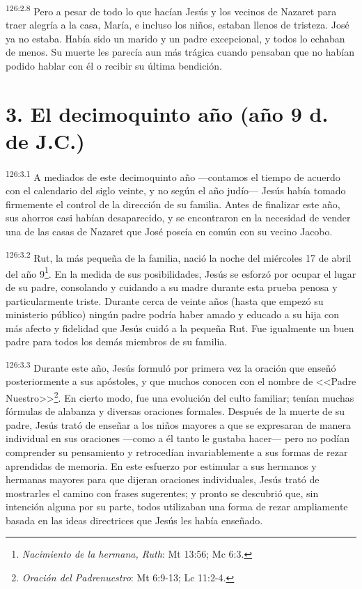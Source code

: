 \par 
\textsuperscript{126:2.8} Pero a pesar de todo lo que hacían Jesús y los vecinos de Nazaret para traer alegría a la casa, María, e incluso los niños, estaban llenos de tristeza. José ya no estaba. Había sido un marido y un padre excepcional, y todos lo echaban de menos. Su muerte les parecía aun más trágica cuando pensaban que no habían podido hablar con él o recibir su última bendición.

\section*{3. El decimoquinto año (año 9 d. de J.C.)}
\par 
\textsuperscript{126:3.1} A mediados de este decimoquinto año ---contamos el tiempo de acuerdo con el calendario del siglo veinte, y no según el año judío--- Jesús había tomado firmemente el control de la dirección de su familia. Antes de finalizar este año, sus ahorros casi habían desaparecido, y se encontraron en la necesidad de vender una de las casas de Nazaret que José poseía en común con su vecino Jacobo.

\par 
\textsuperscript{126:3.2} Rut, la más pequeña de la familia, nació la noche del miércoles 17 de abril del año 9\footnote{\textit{Nacimiento de la hermana, Ruth}: Mt 13:56; Mc 6:3.}. En la medida de sus posibilidades, Jesús se esforzó por ocupar el lugar de su padre, consolando y cuidando a su madre durante esta prueba penosa y particularmente triste. Durante cerca de veinte años (hasta que empezó su ministerio público) ningún padre podría haber amado y educado a su hija con más afecto y fidelidad que Jesús cuidó a la pequeña Rut. Fue igualmente un buen padre para todos los demás miembros de su familia.

\par 
\textsuperscript{126:3.3} Durante este año, Jesús formuló por primera vez la oración que enseñó posteriormente a sus apóstoles, y que muchos conocen con el nombre de <<Padre Nuestro>>\footnote{\textit{Oración del Padrenuestro}: Mt 6:9-13; Lc 11:2-4.}. En cierto modo, fue una evolución del culto familiar; tenían muchas fórmulas de alabanza y diversas oraciones formales. Después de la muerte de su padre, Jesús trató de enseñar a los niños mayores a que se expresaran de manera individual en sus oraciones ---como a él tanto le gustaba hacer--- pero no podían comprender su pensamiento y retrocedían invariablemente a sus formas de rezar aprendidas de memoria. En este esfuerzo por estimular a sus hermanos y hermanas mayores para que dijeran oraciones individuales, Jesús trató de mostrarles el camino con frases sugerentes; y pronto se descubrió que, sin intención alguna por su parte, todos utilizaban una forma de rezar ampliamente basada en las ideas directrices que Jesús les había enseñado.

